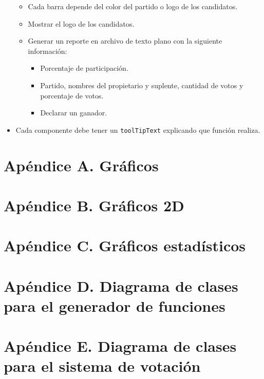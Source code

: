 \documentclass[11pt]{article}
\begin{document}
\begin{itemize}
\begin{itemize}
\item Cada barra depende del color del partido o logo de los candidatos.
\item Mostrar el logo de los candidatos.
\item Generar un reporte en archivo de texto plano con la siguiente información:
\begin{itemize}
\item Porcentaje de participación.
\item Partido, nombres del propietario y suplente, cantidad de votos y porcentaje de votos.
\item Declarar un ganador.
\end{itemize}
\end{itemize} 
\item Cada componente debe tener un \texttt{toolTipText} explicando que función realiza.
\end{itemize}
\newpage


\section*{Apéndice A. Gráficos}

\newpage
\section*{Apéndice B. Gráficos 2D}

\newpage
\section*{Apéndice C. Gráficos estadísticos}

\newpage

\section*{Apéndice D. Diagrama de clases para el generador de funciones}

\newpage
\section*{Apéndice E. Diagrama de clases para el sistema de votación}

\newpage


\newpage


\end{document}
